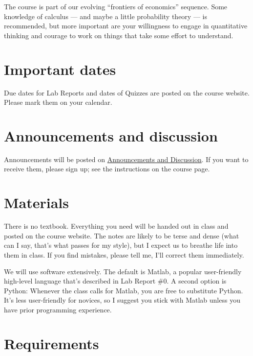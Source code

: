 \documentclass[11pt]{article}
\begin{document}
The course is part of our evolving ``frontiers of economics''
sequence.
Some knowledge of calculus --- and maybe a little probability theory --- is recommended,
but more important are your willingness to engage in quantitative thinking
and courage to work on things that take some effort to understand.


\section*{Important dates}

Due dates for Lab Reports and dates of Quizzes are posted on the course website.
Please mark them on your calendar.


\section*{Announcements and discussion}

Announcements will be posted on
\href{https://sites.google.com/site/nyusternmacrofoundations/home/e-announcements}
{Announcements and Discussion}.
If you want to receive them, please sign up; see the instructions on the course page.


\section*{Materials}

There is no textbook.  Everything you need will be
handed out in class and posted on the course website.
The notes are likely to be terse and dense
(what can I say, that's what passes for my style),
but I expect us to breathe life into them in class.
If you find mistakes, please tell me, I'll correct them immediately.


We will use software extensively.
The default is Matlab, a popular user-friendly high-level language that's described
in  Lab Report \#0.
A second option is Python:  Whenever the class calls for Matlab,
you are free to substitute Python.
It's less user-friendly for novices,
so I suggest you stick
with Matlab unless you have prior programming experience.


\section*{Requirements}
\end{document}
